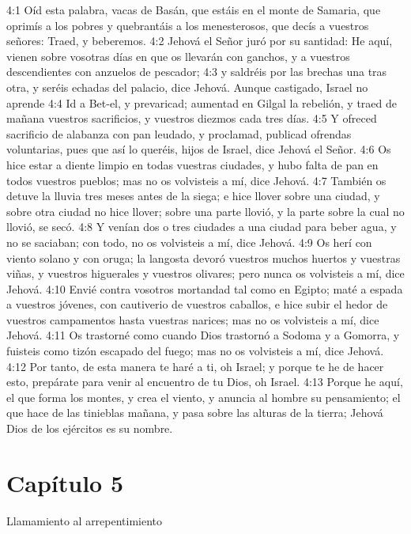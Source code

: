 4:1 Oíd esta palabra, vacas de Basán, que estáis en el monte de Samaria, que oprimís a los pobres y quebrantáis a los menesterosos, que decís a vuestros señores: Traed, y beberemos.   
4:2 Jehová el Señor juró por su santidad: He aquí, vienen sobre vosotras días en que os llevarán con ganchos, y a vuestros descendientes con anzuelos de pescador;   
4:3 y saldréis por las brechas una tras otra, y seréis echadas del palacio, dice Jehová.   
Aunque castigado, Israel no aprende   
4:4 Id a Bet-el, y prevaricad; aumentad en Gilgal la rebelión, y traed de mañana vuestros sacrificios, y vuestros diezmos cada tres días.   
4:5 Y ofreced sacrificio de alabanza con pan leudado, y proclamad, publicad ofrendas voluntarias, pues que así lo queréis, hijos de Israel, dice Jehová el Señor.   
4:6 Os hice estar a diente limpio en todas vuestras ciudades, y hubo falta de pan en todos vuestros pueblos; mas no os volvisteis a mí, dice Jehová.   
4:7 También os detuve la lluvia tres meses antes de la siega; e hice llover sobre una ciudad, y sobre otra ciudad no hice llover; sobre una parte llovió, y la parte sobre la cual no llovió, se secó.   
4:8 Y venían dos o tres ciudades a una ciudad para beber agua, y no se saciaban; con todo, no os volvisteis a mí, dice Jehová.   
4:9 Os herí con viento solano y con oruga; la langosta devoró vuestros muchos huertos y vuestras viñas, y vuestros higuerales y vuestros olivares; pero nunca os volvisteis a mí, dice Jehová.   
4:10 Envié contra vosotros mortandad tal como en Egipto; maté a espada a vuestros jóvenes, con cautiverio de vuestros caballos, e hice subir el hedor de vuestros campamentos hasta vuestras narices; mas no os volvisteis a mí, dice Jehová.   
4:11 Os trastorné como cuando Dios trastornó a Sodoma y a Gomorra, y fuisteis como tizón escapado del fuego; mas no os volvisteis a mí, dice Jehová.   
4:12 Por tanto, de esta manera te haré a ti, oh Israel; y porque te he de hacer esto, prepárate para venir al encuentro de tu Dios, oh Israel.   
4:13 Porque he aquí, el que forma los montes, y crea el viento, y anuncia al hombre su pensamiento; el que hace de las tinieblas mañana, y pasa sobre las alturas de la tierra; Jehová Dios de los ejércitos es su nombre.   
\section*{Capítulo 5  }
Llamamiento al arrepentimiento   
  

